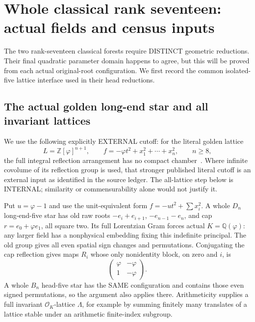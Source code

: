 \documentclass[11pt]{article}
\begin{document}
\section{Whole classical rank seventeen: actual fields and census inputs}
\label{app:arithBD17actual}

The two rank-seventeen classical forests require
DISTINCT geometric reductions.
Their final quadratic parameter domain happens
to agree, but this will be proved from each
actual original-root configuration.
We first record the common isolated-five lattice
interface used in their head reductions.

\subsection{The actual golden long-end star and all invariant lattices}
\label{app:arithgoldenlongstar}

We use the following explicitly EXTERNAL cutoff:
for the literal golden lattice
\[
 L=\mathbb Z[\varphi]^{n+1},\qquad
 f=-\varphi t^2+x_1^2+\cdots+x_n^2,\qquad n\ge8,
\]
the full integral reflection arrangement has no
compact chamber~\cite{BugaenkoGolden1984}.
Where infinite covolume of its reflection group
is used, that stronger published literal cutoff
is an external input as identified in the source ledger.
The all-lattice step below is INTERNAL; similarity
or commensurability alone would not justify it.

Put \(u=\varphi-1\) and use the unit-equivalent
form \(f=-ut^2+\sum x_i^2\).
A whole \(D_n\) long-end-five star has old raw
roots \(-e_i+e_{i+1}\), \(-e_{n-1}-e_n\),
and cap \(r=e_0+\varphi e_1\), all square two.
Its full Lorentzian Gram forces actual
\(K=\mathbb Q(\varphi)\): any larger field has
a nonphysical embedding fixing this indefinite
principal.
The old group gives all even spatial sign
changes and permutations.
Conjugating the cap reflection gives maps \(R_i\)
whose only nonidentity block, on zero and \(i\), is
\[
                         \begin{pmatrix}\varphi&-\varphi\\
                                          1&-\varphi\end{pmatrix}.
\]
A whole \(B_n\) head-five star has the SAME
configuration and contains those even signed
permutations, so the argument also applies there.
Arithmeticity supplies a full invariant
\(\mathcal O_K\)-lattice \(\Lambda\), for example
by summing finitely many translates of a lattice
stable under an arithmetic finite-index subgroup.
\end{document}
